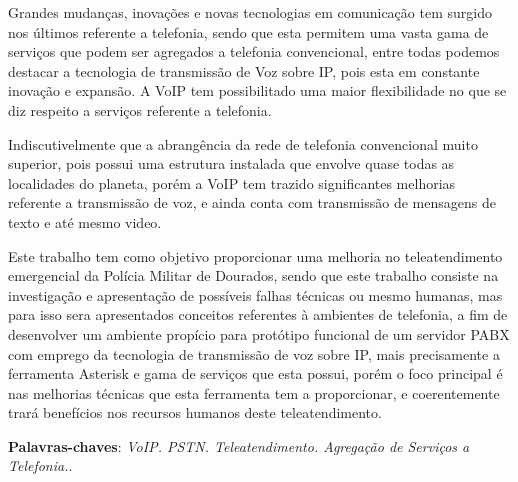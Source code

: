 \setlength{\absparsep}{18pt} %
\begin{resumo}

Grandes mudanças, inovações e novas tecnologias em comunicação tem surgido nos últimos referente a telefonia, sendo que esta permitem uma vasta gama de serviços que podem ser agregados a telefonia convencional, entre todas podemos destacar a tecnologia de transmissão de Voz sobre IP, pois esta em constante inovação e expansão. A VoIP tem possibilitado uma maior flexibilidade no que se diz respeito a serviços referente a telefonia.

Indiscutivelmente que a abrangência da rede de telefonia convencional muito superior, pois possui uma estrutura instalada que envolve quase todas as localidades do planeta, porém a VoIP tem trazido significantes melhorias referente a transmissão de voz, e ainda conta com transmissão de mensagens de texto e até mesmo video.

Este trabalho tem como objetivo proporcionar uma melhoria no teleatendimento emergencial da Polícia Militar de Dourados, sendo que este trabalho consiste na investigação e apresentação de possíveis falhas técnicas ou mesmo humanas, mas para isso sera apresentados conceitos referentes à ambientes de telefonia, a fim de desenvolver um ambiente propício para protótipo funcional de um servidor PABX com emprego da tecnologia de transmissão de voz sobre IP, mais precisamente a ferramenta Asterisk e gama de serviços que esta possui, porém o foco principal é nas melhorias técnicas que esta ferramenta tem a proporcionar, e coerentemente trará benefícios nos recursos humanos deste teleatendimento.


 \textbf{Palavras-chaves}: \textit{VoIP. PSTN. Teleatendimento. Agregação de Serviços a Telefonia.}.
\end{resumo}

